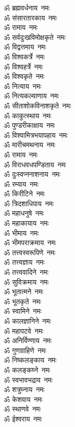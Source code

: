 \begin{multicols}{2}
\begin{flushleft}
ॐ ब्रह्मवर्धनाय~नमः\\
ॐ संसारतारकाय~नमः\\
ॐ रामाय~नमः\\
ॐ सर्वदुःखविमोक्षकृते~नमः\\
ॐ विद्वत्तमाय~नमः\\
ॐ विश्वकर्त्रे~नमः\\
ॐ विश्वहर्त्रे~नमः\\
ॐ विश्वकृते~नमः\\
ॐ नित्याय~नमः\hfill{}\\
ॐ नित्यकल्याणाय~नमः\\
ॐ सीताशोकविनाशकृते~नमः\\
ॐ काकुत्स्थाय~नमः\\
ॐ पुण्डरीकाक्षाय~नमः\\
ॐ विश्वामित्रभयापहाय~नमः\\
ॐ मारीचमथनाय~नमः\\
ॐ रामाय~नमः\\
ॐ विराधवधपण्डिताय~नमः\\
ॐ दुःस्वप्ननाशनाय~नमः\\
ॐ रम्याय~नमः\hfill{}\\
ॐ किरीटिने~नमः\\
ॐ त्रिदशाधिपाय~नमः\\
ॐ महाधनुषे~नमः\\
ॐ महाकायाय~नमः\\
ॐ भीमाय~नमः\\
ॐ भीमपराक्रमाय~नमः\\
ॐ तत्त्वस्वरूपिणे~नमः\\
ॐ तत्त्वज्ञाय~नमः\\
ॐ तत्त्ववादिने~नमः\\
ॐ सुविक्रमाय~नमः\hfill{}\\
ॐ भूतात्मने~नमः\\
ॐ भूतकृते~नमः\\
ॐ स्वामिने~नमः\\
ॐ कालज्ञानिने~नमः\\
ॐ महापटवे~नमः\\
ॐ अनिर्विण्णाय~नमः\\
ॐ गुणग्राहिणे~नमः\\
ॐ निष्कलङ्काय~नमः\\
ॐ कलङ्कघ्ने~नमः\\
ॐ स्वभावभद्राय~नमः\hfill{}\\
ॐ शत्रुघ्नाय~नमः\\
ॐ केशवाय~नमः\\
ॐ स्थाणवे~नमः\\
ॐ ईश्वराय~नमः\\

\end{flushleft}
\end{multicols}

